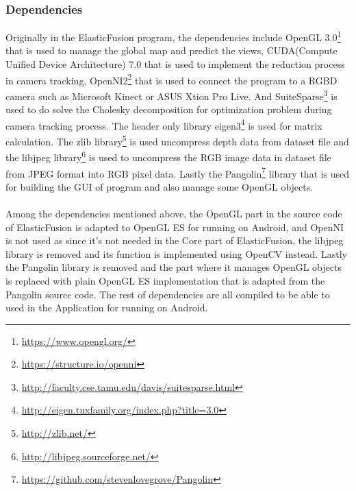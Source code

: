 \documentclass[12pt,twoside]{article}
\begin{document}
\subsubsection{Dependencies}
Originally in the ElasticFusion program, the dependencies include OpenGL 3.0\footnote{\url{https://www.opengl.org/}} that is used to manage the global map and predict the views, CUDA(Compute Unified Device Architecture) 7.0 that is used to implement the reduction process in camera tracking, OpenNI2\footnote{\url{https://structure.io/openni}} that is used to connect the program to a RGBD camera such as Microsoft Kinect or ASUS Xtion Pro Live. And SuiteSparse\footnote{\url{http://faculty.cse.tamu.edu/davis/suitesparse.html}} is used to do solve the Cholesky decomposition for optimization problem during camera tracking process. The header only library eigen3\footnote{\url{http://eigen.tuxfamily.org/index.php?title=3.0}} is used for matrix calculation. The zlib library\footnote{\url{http://zlib.net/}} is used uncompress depth data from dataset file and the libjpeg library\footnote{\url{http://libjpeg.sourceforge.net/}} is used to uncompress the RGB image data in dataset file from JPEG format into RGB pixel data. Lastly the Pangolin\footnote{\url{https://github.com/stevenlovegrove/Pangolin}} library that is used for building the GUI of program and also manage some OpenGL objects. \\
\\
Among the dependencies mentioned above, the OpenGL part in the source code of ElasticFusion is adapted to OpenGL ES for running on Android, and OpenNI is not used as since it's not needed in the Core part of ElasticFusion, the libjpeg library is removed and its function is implemented using OpenCV instead. Lastly the Pangolin library is removed and the part where it manages OpenGL objects is replaced with plain OpenGL ES implementation that is adapted from the Pangolin source code. The rest of dependencies are all compiled to be able to used in the Application for running on Android.\\
\end{document}
